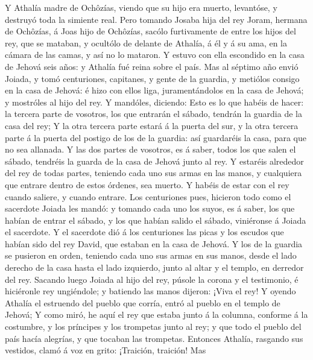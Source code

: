  Y Athalía madre de Ochôzías, viendo que su hijo era
muerto, levantóse, y destruyó toda la simiente real.  Pero
tomando Josaba hija del rey Joram, hermana de Ochôzías, á Joas hijo de
Ochôzías, sacólo furtivamente de entre los hijos del rey, que se
mataban, y ocultólo de delante de Athalía, á él y á su ama, en la cámara
de las camas, y así no lo mataron.  Y estuvo con ella
escondido en la casa de Jehová seis años: y Athalía fué reina sobre el
país.  Mas al séptimo año envió Joiada, y tomó
centuriones, capitanes, y gente de la guardia, y metiólos consigo en la
casa de Jehová: é hizo con ellos liga, juramentándolos en la casa de
Jehová; y mostróles al hijo del rey.  Y mandóles,
diciendo: Esto es lo que habéis de hacer: la tercera parte de vosotros,
los que entrarán el sábado, tendrán la guardia de la casa del rey;
 Y la otra tercera parte estará á la puerta del sur, y la
otra tercera parte á la puerta del postigo de los de la guardia: así
guardaréis la casa, para que no sea allanada.  Y las dos
partes de vosotros, es á saber, todos los que salen el sábado, tendréis
la guarda de la casa de Jehová junto al rey.  Y estaréis
alrededor del rey de todas partes, teniendo cada uno sus armas en las
manos, y cualquiera que entrare dentro de estos órdenes, sea muerto. Y
habéis de estar con el rey cuando saliere, y cuando entrare.
 Los centuriones pues, hicieron todo como el sacerdote
Joiada les mandó: y tomando cada uno los suyos, es á saber, los que
habían de entrar el sábado, y los que habían salido el sábado,
viniéronse á Joiada el sacerdote.  Y el sacerdote dió á
los centuriones las picas y los escudos que habían sido del rey David,
que estaban en la casa de Jehová.  Y los de la guardia se
pusieron en orden, teniendo cada uno sus armas en sus manos, desde el
lado derecho de la casa hasta el lado izquierdo, junto al altar y el
templo, en derredor del rey.  Sacando luego Joiada al
hijo del rey, púsole la corona y el testimonio, é hiciéronle rey
ungiéndole; y batiendo las manos dijeron: ¡Viva el rey! 
Y oyendo Athalía el estruendo del pueblo que corría, entró al pueblo en
el templo de Jehová;  Y como miró, he aquí el rey que
estaba junto á la columna, conforme á la costumbre, y los príncipes y
los trompetas junto al rey; y que todo el pueblo del país hacía
alegrías, y que tocaban las trompetas. Entonces Athalía, rasgando sus
vestidos, clamó á voz en grito: ¡Traición, traición!  Mas

